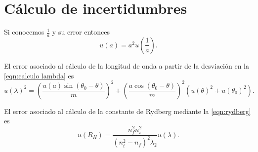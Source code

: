 \documentclass[12pt]{article}
\numberwithin{table}{section}
\numberwithin{figure}{section}
\numberwithin{equation}{section}
\begin{document}
\printbibliography

\newpage
\appendix
\section{Cálculo de incertidumbres}
Si conocemos \( \frac{1}{a} \) y su error entonces
\begin{equation}\label{eqn:error separacion}
	u(a) = a^2 u\left(\frac{1}{a}\right).
\end{equation}

El error asociado al cálculo de la longitud de onda a partir de la desviación en la \cref{eqn:calculo lambda} es
\begin{equation} \label{eqn:error lambda}
	u(\lambda)^2 = \left(\frac{u(a)\sin{(\theta_0 - \theta)}}{m}\right)^2 + \left(\frac{a\cos{(\theta_0 - \theta)}}{m}\right)^2 (u(\theta)^2 + u(\theta_0)^2).
\end{equation}

El error asociado al cálculo de la constante de Rydberg mediante la \cref{eqn:rydberg} es
\begin{equation} \label{eqn:error rydberg}
	u(R_H) = \frac{n_f^2n_i^2}{(n_i^2 - n_f)^2 \lambda_2} u(\lambda).
\end{equation}


\newpage
\end{document}
